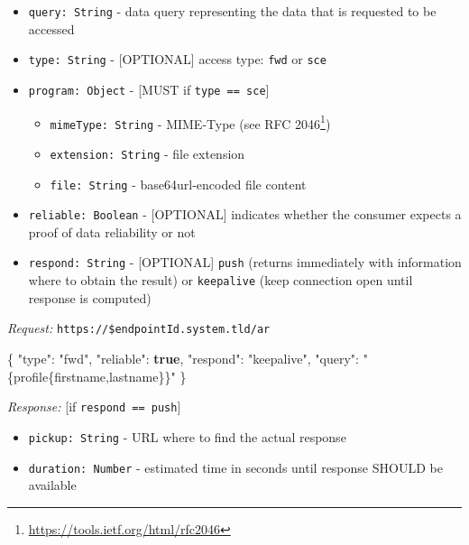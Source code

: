 \documentclass[12pt,english,a4paper,titlepage,cleardoublepage=empty,dottedtoc]{report}
\newenvironment{Shaded}{\begin{snugshade}}{\end{snugshade}}
\newcommand{\KeywordTok}[1]{\textcolor[rgb]{0.13,0.29,0.53}{\textbf{#1}}}
\newcommand{\DataTypeTok}[1]{\textcolor[rgb]{0.13,0.29,0.53}{#1}}
\newcommand{\StringTok}[1]{\textcolor[rgb]{0.31,0.60,0.02}{#1}}
\newcommand{\FunctionTok}[1]{\textcolor[rgb]{0.00,0.00,0.00}{#1}}
\renewcommand{\href}[2]{#2\footnote{\url{#1}}}
\providecommand{\tightlist}{%
  \setlength{\itemsep}{0pt}\setlength{\parskip}{0pt}}
\begin{document}
\begin{itemize}
\tightlist
\item
  \texttt{query:\ String} - data query representing the data that is
  requested to be accessed
\item
  \texttt{type:\ String} - {[}OPTIONAL{]} access type: \texttt{fwd} or
  \texttt{sce}
\item
  \texttt{program:\ Object} - {[}MUST if
  \texttt{type\ ==\ \textquotesingle{}sce\textquotesingle{}}{]}

  \begin{itemize}
  \tightlist
  \item
    \texttt{mimeType:\ String} - MIME-Type (see
    \href{https://tools.ietf.org/html/rfc2046}{RFC 2046})
  \item
    \texttt{extension:\ String} - file extension
  \item
    \texttt{file:\ String} - base64url-encoded file content
  \end{itemize}
\item
  \texttt{reliable:\ Boolean} - {[}OPTIONAL{]} indicates whether the
  consumer expects a proof of data reliability or not
\item
  \texttt{respond:\ String} - {[}OPTIONAL{]} \texttt{push} (returns
  immediately with information where to obtain the result) or
  \texttt{keepalive} (keep connection open until response is computed)
\end{itemize}

\emph{Request:} \texttt{https://\$endpointId.system.tld/ar}

\begin{Shaded}
\begin{Highlighting}[numbers=left,,]
\FunctionTok{\{}
    \DataTypeTok{"type"}\FunctionTok{:} \StringTok{"fwd"}\FunctionTok{,}
    \DataTypeTok{"reliable"}\FunctionTok{:} \KeywordTok{true}\FunctionTok{,}
    \DataTypeTok{"respond"}\FunctionTok{:} \StringTok{"keepalive"}\FunctionTok{,}
    \DataTypeTok{"query"}\FunctionTok{:} \StringTok{"\{profile\{firstname,lastname\}\}"}
\FunctionTok{\}}
\end{Highlighting}
\end{Shaded}

\emph{Response:} {[}if
\texttt{respond\ ==\ \textquotesingle{}push\textquotesingle{}}{]}

\begin{itemize}
\tightlist
\item
  \texttt{pickup:\ String} - URL where to find the actual response
\item
  \texttt{duration:\ Number} - estimated time in seconds until response
  SHOULD be available
\end{itemize}
\end{document}
